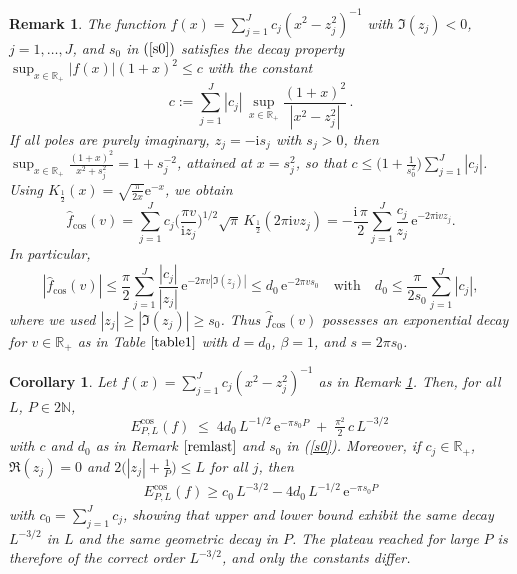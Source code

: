\documentclass[11pt,a4paper]{scrartcl}
\newtheorem{remark}[theorem]{Remark}
\newtheorem{corollary}[theorem]{Corollary}
\numberwithin{equation}{section}
\numberwithin{table}{section}
\numberwithin{figure}{section}
\newcommand{\e}{\mathrm e}
\renewcommand{\i}{\mathrm i}
\newcommand{\N}{\mathbb N}
\newcommand{\Rp}{{\mathbb R}_{+}}
\newcommand{\fcos}{{\hat f}_{\cos}}
\newcommand{\Ecos}{E^{\cos}}
\begin{document}
\begin{remark}\label{remlast}
The  function $f(x) = \sum_{j=1}^J c_{j} (x^2-z_j^2)^{-1}$ with $\Im(z_j) <0$, $j=1, \ldots , J$,  and $s_0$ in $(\ref{s0})$
satisfies the decay property $\sup_{x \in \Rp} |f(x)| (1+x)^2 \le c$ with the constant
$$
\textstyle c := \sum\limits_{j=1}^J |c_j| \, \sup\limits_{x \in \Rp}\frac{(1+x)^2}{|x^2-z_j^2|}\,.
$$
If all poles are purely imaginary, $z_j = -\i s_j$ with $s_j>0$, then
$\sup_{x\in\Rp}\frac{(1+x)^2}{x^2+s_j^2} = 1 + s_j^{-2}$, attained at $x = s_j^2$, so that
$c \le \big(1+ \frac{1}{s_0^2}\big)\sum_{j=1}^J |c_j|$.
Using
$K_{\frac{1}{2}}(x) = \sqrt{\frac{\pi}{2x}} \e^{-x}$, we obtain
$$  \textstyle \fcos(v) = \sum\limits_{j=1}^J c_{j}
 \Big(\frac{\pi v}{\i z_j} \Big)^{1/2} \sqrt{\pi} \,
K_{\frac{1}{2}}(2\pi \i v z_j) =  - \frac{\i\,\pi}{2} \sum\limits_{j=1}^J
\frac{c_{j}}{z_j}  \,
 \e^{-2\pi \i v z_j}.
$$
In particular,
$$ \textstyle  |\fcos(v)| \le \frac{\pi}{2} \sum\limits_{j=1}^J
\frac{|c_{j}|}{|z_j|}  \,
 \e^{-2\pi  v |\Im(z_j)|}  \le d_0\,  \e^{-2\pi  v s_0} \quad \text{with} \quad d_0 \le \frac{\pi}{2s_0}
 \sum\limits_{j=1}^J |c_{j}|,
$$
where we used $|z_j| \ge |\Im (z_j)| \ge s_0$.
Thus $\fcos(v)$ possesses an exponential decay for $v \in \Rp$ as in
Table $\ref{table1}$ with $d= d_0$, $\beta=1$, and  $s=2\pi s_0$.
\end{remark}

\begin{corollary}
	\label{Cor:ratFT}
	Let $f(x) =  \sum\limits_{j=1}^J c_{j} (x^2-z_j^2)^{-1}$ as in Remark \ref{remlast}.
	Then, for all $L$, $P \in 2\N$,
	\begin{equation}
		\label{eq:raterror}
		\Ecos_{P,L}(f) \;\leq\; 4d_0\,L^{-1/2}\,\e^{-\pi s_0 P}
		\;+\; \tfrac{\pi^2}{2}\,c\,L^{-3/2}\,
	\end{equation}
	with $c$ and $d_0$ as in Remark $\ref{remlast}$ and $s_0$ in (\ref{s0}).
	Moreover, if $c_j \in \Rp$, $\Re(z_j) =0$ and $2\big(|z_j|+\frac1P\big) \le L$ for all $j$, then
\begin{align}\label{eq:errorlow}
\textstyle \Ecos_{P,L}(f) \ge  c_0\, L^{-3/2} -  4d_0\,L^{-1/2}\,\e^{-\pi s_0 P}
\end{align}
with $c_0 = \sum\limits_{j=1}^J c_{j}  $, showing that upper and lower bound exhibit the same
decay $L^{-3/2}$ in $L$ and the same geometric decay in $P$. The plateau reached for large $P$ is
therefore of the correct order $L^{-3/2}$, and only the constants differ.
\end{corollary}
\end{document}
